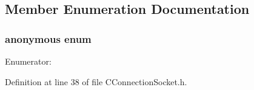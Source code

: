 \subsection{\-Member \-Enumeration \-Documentation}
\hypertarget{class_c_connection_socket_a0d76efb3e65e70281ce2f12dc36dc329}{\subsubsection[{anonymous enum}]{\setlength{\rightskip}{0pt plus 5cm}anonymous enum}}\label{class_c_connection_socket_a0d76efb3e65e70281ce2f12dc36dc329}
\begin{Desc}
\item[\-Enumerator\-: ]\par
\begin{description}
\item[{\em 
\hypertarget{class_c_connection_socket_a0d76efb3e65e70281ce2f12dc36dc329a5b96f929feebb30dc72b969542959beb}{\-C\-S\-\_\-\-B\-U\-F\-F\-E\-R\-\_\-\-S\-I\-Z\-E}\label{class_c_connection_socket_a0d76efb3e65e70281ce2f12dc36dc329a5b96f929feebb30dc72b969542959beb}
}]\end{description}
\end{Desc}



\-Definition at line 38 of file \-C\-Connection\-Socket.\-h.

